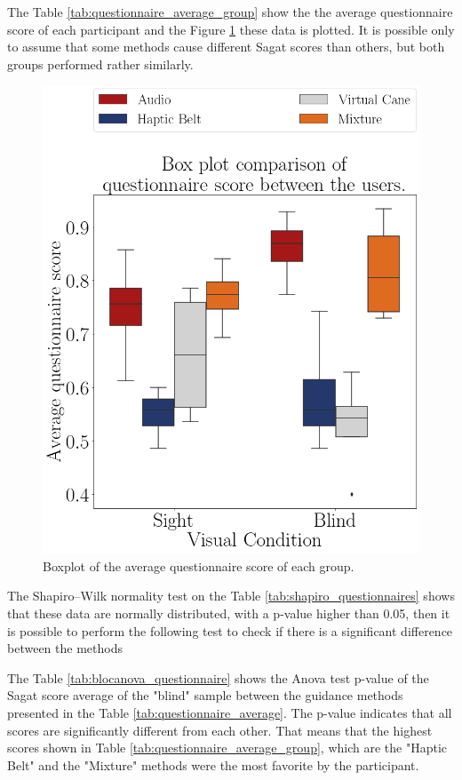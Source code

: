 The Table \ref{tab:questionnaire_average_group} show the the average questionnaire score of each participant and the Figure \ref{fig:boxplot_questionnaire_scene} these data is plotted. It is possible only to assume that some methods cause different Sagat scores than others, but both groups performed rather similarly.



\begin{figure}[!htb]
    \centering
    \includegraphics[width = 0.5\linewidth]{Resultados/Questionario/Figuras/png/boxplot_questionnaire_scene.png}
    \caption{Boxplot of the average questionnaire score of each group.}
    \label{fig:boxplot_questionnaire_scene}
\end{figure}

The Shapiro–Wilk normality test on the Table \ref{tab:shapiro_questionnaires} shows that these data are normally distributed, with a p-value higher than 0.05, then it is possible to perform the following test to check if there is a significant difference between the methods



The Table \ref{tab:blocanova_questionnaire} shows the Anova test p-value of the Sagat score average of the "blind" sample between the guidance methods presented in the Table \ref{tab:questionnaire_average}. The p-value indicates that all scores are significantly different from each other. That means that the highest scores shown in Table \ref{tab:questionnaire_average_group}, which are the "Haptic Belt" and the "Mixture" methods were the most favorite by the participant.



\FloatBarrier